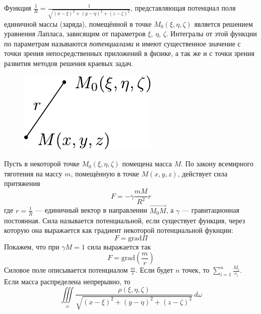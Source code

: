 \setcounter{equation}{0}
Функция $\frac{1}{R} = \frac{1}{\sqrt{(x - \xi)^2 + (y - \eta)^2 + (z - \zeta)^2}}$, представляющая потенциал поля единичной массы (заряда), помещённой в точке $M_0(\xi, \eta, \zeta)$ является решением уравнения Лапласа, зависящим от параметров $\xi$, $\eta$, $\zeta$. Интегралы от этой функции по параметрам называются \textit{потенциалами} и имеют существенное значение с точки зрения непосредственных приложений в физике, а так же и с точки зрения развития методов решения краевых задач.\\

\begin{figure}
	\centering
	\includegraphics{figPotentialTheo1.pdf}
\end{figure}
Пусть в некоторой точке $M_0(\xi, \eta, \zeta)$ помещена масса $M$. По закону всемирного тяготения на массу $m$, помещённую в точке $M(x, y, z)$, действует сила притяжения
\[
	F = - \gamma \frac{mM}{R^2} r
\]
где $r = \frac{1}{R}$ --- единичный вектор в направлении $\overrightarrow{M_0M}$, а $\gamma$ --- гравитационная постоянная. 
Сила называется потенциальной, если существует функция, через которую она выражается как градиент некоторой потенциальной фукнции:
\[
	F = \mathrm{grad} \Pi
\]
Покажем, что при $\gamma M = 1$ сила выражается так
\[
	F = \mathrm{grad} \left(\frac{m}{r} \right)
\]
Силовое поле описывается потенциалом $\frac{m}{r}$. Если будет $n$ точек, то $\sum\limits_{i=1}^n \frac{M_i}{r_i}$. \\
Если масса распределена непрерывно, то 
\[
	\iiint\limits_{\omega} \frac{\rho (\xi, \eta, \zeta)}{\sqrt{(x - \xi)^2 + (y - \eta)^2 + (z - \zeta)^2}}\, d\omega
\]

